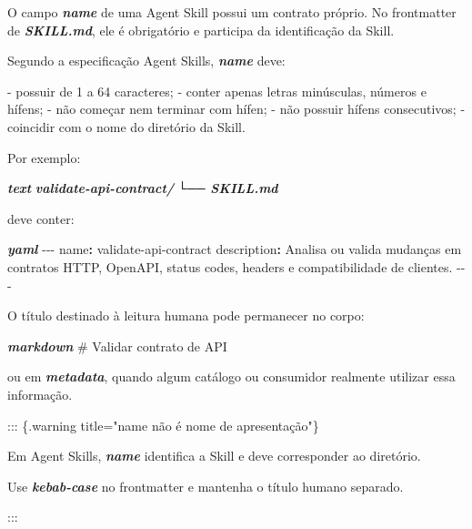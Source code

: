 \documentclass[
  10pt,
  a4paper,
  oneside]{book}
\newenvironment{Shaded}{}{}
\newcommand{\AttributeTok}[1]{\textcolor[rgb]{0.49,0.56,0.16}{#1}}
\newcommand{\FunctionTok}[1]{\textcolor[rgb]{0.02,0.16,0.49}{#1}}
\newcommand{\InformationTok}[1]{\textcolor[rgb]{0.38,0.63,0.69}{\textbf{\textit{#1}}}}
\newcommand{\KeywordTok}[1]{\textcolor[rgb]{0.00,0.44,0.13}{\textbf{#1}}}
\newcommand{\NormalTok}[1]{#1}
\newcommand{\PreprocessorTok}[1]{\textcolor[rgb]{0.74,0.48,0.00}{#1}}
\newcommand{\SpecialStringTok}[1]{\textcolor[rgb]{0.73,0.40,0.53}{#1}}
\renewenvironment{Shaded}{\begin{snugshade}}{\end{snugshade}}%
\begin{document}
\begin{Shaded}
\begin{Highlighting}[]
\NormalTok{O campo }\InformationTok{\textasciigrave{}name\textasciigrave{}}\NormalTok{ de uma Agent Skill possui um contrato próprio. No frontmatter de }\InformationTok{\textasciigrave{}SKILL.md\textasciigrave{}}\NormalTok{, ele é obrigatório e participa da identificação da Skill.}

\NormalTok{Segundo a especificação Agent Skills, }\InformationTok{\textasciigrave{}name\textasciigrave{}}\NormalTok{ deve:}

\SpecialStringTok{{-} }\NormalTok{possuir de 1 a 64 caracteres;}
\SpecialStringTok{{-} }\NormalTok{conter apenas letras minúsculas, números e hífens;}
\SpecialStringTok{{-} }\NormalTok{não começar nem terminar com hífen;}
\SpecialStringTok{{-} }\NormalTok{não possuir hífens consecutivos;}
\SpecialStringTok{{-} }\NormalTok{coincidir com o nome do diretório da Skill.}

\NormalTok{Por exemplo:}

\InformationTok{\textasciigrave{}\textasciigrave{}\textasciigrave{}text}
\InformationTok{validate{-}api{-}contract/}
\InformationTok{└── SKILL.md}
\InformationTok{\textasciigrave{}\textasciigrave{}\textasciigrave{}}

\NormalTok{deve conter:}

\InformationTok{\textasciigrave{}\textasciigrave{}\textasciigrave{}yaml}
\PreprocessorTok{{-}{-}{-}}
\FunctionTok{name}\KeywordTok{:}\AttributeTok{ validate{-}api{-}contract}
\FunctionTok{description}\KeywordTok{:}\AttributeTok{ Analisa ou valida mudanças em contratos HTTP, OpenAPI, status codes, headers e compatibilidade de clientes.}
\PreprocessorTok{{-}{-}{-}}
\InformationTok{\textasciigrave{}\textasciigrave{}\textasciigrave{}}

\NormalTok{O título destinado à leitura humana pode permanecer no corpo:}

\InformationTok{\textasciigrave{}\textasciigrave{}\textasciigrave{}markdown}
\FunctionTok{\# Validar contrato de API}
\InformationTok{\textasciigrave{}\textasciigrave{}\textasciigrave{}}

\NormalTok{ou em }\InformationTok{\textasciigrave{}metadata\textasciigrave{}}\NormalTok{, quando algum catálogo ou consumidor realmente utilizar essa informação.}

\NormalTok{::: \{.warning title="name não é nome de apresentação"\}}

\NormalTok{Em Agent Skills, }\InformationTok{\textasciigrave{}name\textasciigrave{}}\NormalTok{ identifica a Skill e deve corresponder ao diretório.}

\NormalTok{Use }\InformationTok{\textasciigrave{}kebab{-}case\textasciigrave{}}\NormalTok{ no frontmatter e mantenha o título humano separado.}

\NormalTok{:::}
\end{Highlighting}
\end{Shaded}
\end{document}
